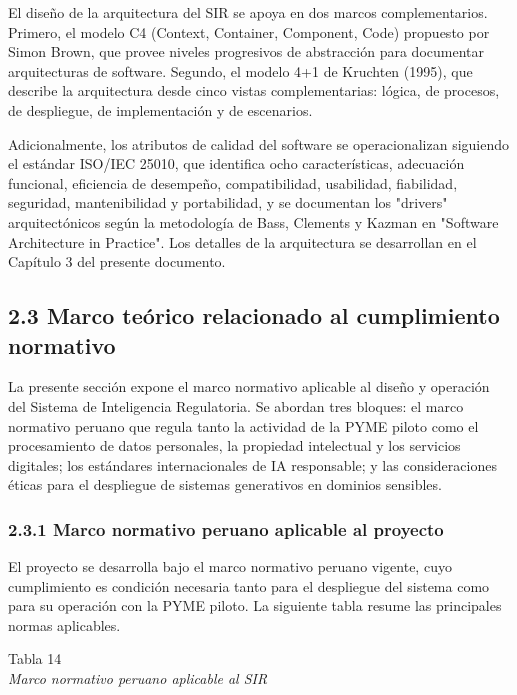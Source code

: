 \documentclass[12pt,a4paper,oneside]{report}
\begin{document}
El diseño de la arquitectura del SIR se apoya en dos marcos
complementarios. Primero, el modelo C4 (Context, Container, Component,
Code) propuesto por Simon Brown, que provee niveles progresivos de
abstracción para documentar arquitecturas de software. Segundo, el
modelo 4+1 de Kruchten (1995), que describe la arquitectura desde cinco
vistas complementarias: lógica, de procesos, de despliegue, de
implementación y de escenarios.

Adicionalmente, los atributos de calidad del software se operacionalizan
siguiendo el estándar ISO/IEC 25010, que identifica ocho
características, adecuación funcional, eficiencia de desempeño,
compatibilidad, usabilidad, fiabilidad, seguridad, mantenibilidad y
portabilidad, y se documentan los "drivers" arquitectónicos según la
metodología de Bass, Clements y Kazman en "Software Architecture in
Practice". Los detalles de la arquitectura se desarrollan en el Capítulo
3 del presente documento.

\subsection{2.3 Marco teórico relacionado al cumplimiento
normativo}\label{marco-teuxf3rico-relacionado-al-cumplimiento-normativo}

La presente sección expone el marco normativo aplicable al diseño y
operación del Sistema de Inteligencia Regulatoria. Se abordan tres
bloques: el marco normativo peruano que regula tanto la actividad de la
PYME piloto como el procesamiento de datos personales, la propiedad
intelectual y los servicios digitales; los estándares internacionales de
IA responsable; y las consideraciones éticas para el despliegue de
sistemas generativos en dominios sensibles.

\subsubsection{2.3.1 Marco normativo peruano aplicable al
proyecto}\label{marco-normativo-peruano-aplicable-al-proyecto}

El proyecto se desarrolla bajo el marco normativo peruano vigente, cuyo
cumplimiento es condición necesaria tanto para el despliegue del sistema
como para su operación con la PYME piloto. La siguiente tabla resume las
principales normas aplicables.

\label{_Toc231672269}{}Tabla 14\\
\emph{Marco normativo peruano aplicable al SIR}
\end{document}
